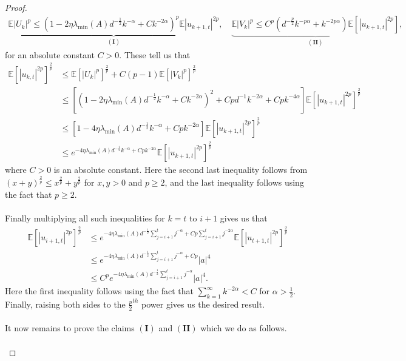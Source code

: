 \documentclass[11pt, reqno,english]{amsart}
\begin{document}
\begin{proof}
\begin{align*}
    \underbrace{\mathbb{E}|U_k|^p \leq (1 - 2\eta\lambda_{\min}(A)d^{-\frac{1}{2}}k^{-\alpha} + Ck^{-2\alpha})^p\mathbb{E}|u_{k+1,t}|^{2p}}_{(\mathbf{I})}, \quad \underbrace{\mathbb{E}|V_k|^p \leq C^p(d^{-\frac{p}{2}}k^{-p\alpha} + k^{-2p\alpha})\mathbb{E}[|u_{k+1,t}|^{2p}]}_{(\mathbf{II})},
\end{align*}
for an absolute constant $C>0$. These tell us that
\begin{align*}
\mathbb{E}[|u_{k,t}|^{2p}]^{\frac{2}{p}} &\leq \mathbb{E}[|U_k|^p]^{\frac{2}{p}} + C(p-1) \mathbb{E}[|V_k|^p]^{\frac{2}{p}}
\\
&\leq [(1 - 2\eta\lambda_{\min}(A)d^{-\frac{1}{2}}k^{-\alpha} + Ck^{-2\alpha})^2 + Cpd^{-1}k^{-2\alpha} + Cpk^{-4\alpha}]\mathbb{E}[|u_{k+1,t}|^{2p}]^{\frac{2}{p}}
\\
&\leq [1 - 4\eta \lambda_{\min}(A)d^{-\frac{1}{2}}k^{-\alpha} + Cpk^{-2\alpha}]\mathbb{E}[|u_{k+1,t}|^{2p}]^{\frac{2}{p}}
\\
&\leq e^{-4\eta \lambda_{\min}(A)d^{-\frac{1}{2}}k^{-\alpha} + Cpk^{-2\alpha}}\mathbb{E}[|u_{k+1,t}|^{2p}]^{\frac{2}{p}}
\end{align*}
where $C > 0$ is an absolute constant. Here the second last inequality follows from $(x + y)^{\frac{2}{p}} \leq x^{\frac{2}{p}} + y^{\frac{2}{p}}$ for $x,y > 0$ and $p \geq 2$, and the last inequality follows using the fact that $p \geq 2$.
\\\\
Finally multiplying all such inequalities for $k = t$ to $i+1$ gives us that
\begin{align*}
\mathbb{E}[|u_{i+1,t}|^{2p}]^{\frac{2}{p}} &\leq  e^{- 4\eta \lambda_{\min}(A)d^{-\frac{1}{2}}\sum_{j = i+1}^tj^{-\alpha} + Cp \sum_{j = i+1}^t j^{-2\alpha}}\mathbb{E}[|u_{t+1,t}|^{2p}]^{\frac{2}{p}}
\\
&\leq  e^{- 4\eta \lambda_{\min}(A)d^{-\frac{1}{2}}\sum_{j = i+1}^tj^{-\alpha} + Cp}|a|^4
\\
&\leq C^{p}e^{-4\eta \lambda_{\min}(A)d^{-\frac{1}{2}}\sum_{j = i+1}^t j^{-\alpha}}|a|^4.
\end{align*}
Here the first inequality follows using the fact that $\sum_{k = 1}^\infty k^{-2\alpha}  < C$ for $\alpha > \frac{1}{2}$. Finally, raising both sides to the $\frac{p}{2}^{th}$ power gives us the desired result.
\\\\
It now remains to prove the claims $(\mathbf{I})$ and $(\mathbf{II})$ which we do as follows.
\\\\

\end{proof}
\end{document}
